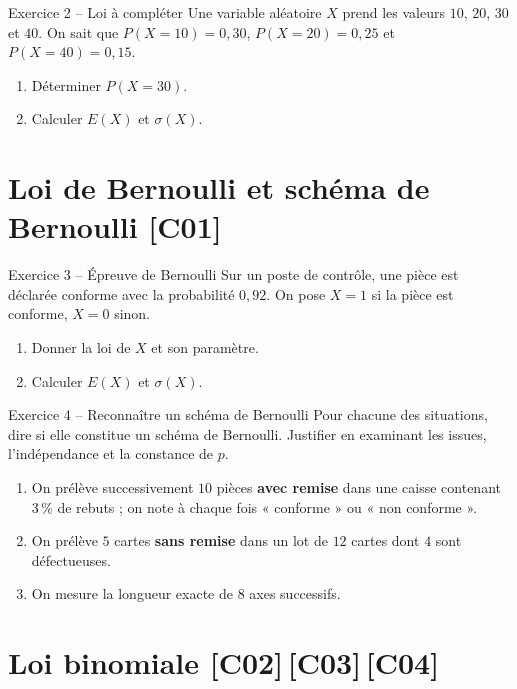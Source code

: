 \documentclass[a4paper,11pt]{article}
\begin{document}
\begin{exo}{Exercice 2 -- Loi à compléter}
Une variable aléatoire $X$ prend les valeurs $10$, $20$, $30$ et $40$. On sait que $P(X=10)=0{,}30$, $P(X=20)=0{,}25$ et $P(X=40)=0{,}15$.
\begin{enumerate}[label=\alph*)]
  \item Déterminer $P(X=30)$.
  \item Calculer $E(X)$ et $\sigma(X)$.
\end{enumerate}
\end{exo}

\section{Loi de Bernoulli et schéma de Bernoulli \hfill {\normalsize\color{uimmred}[C01]}}

\begin{exo}{Exercice 3 -- Épreuve de Bernoulli}
Sur un poste de contrôle, une pièce est déclarée conforme avec la probabilité $0{,}92$. On pose $X = 1$ si la pièce est conforme, $X = 0$ sinon.
\begin{enumerate}[label=\alph*)]
  \item Donner la loi de $X$ et son paramètre.
  \item Calculer $E(X)$ et $\sigma(X)$.
\end{enumerate}
\end{exo}

\begin{exo}{Exercice 4 -- Reconnaître un schéma de Bernoulli}
Pour chacune des situations, dire si elle constitue un schéma de Bernoulli. Justifier en examinant les issues, l'indépendance et la constance de $p$.
\begin{enumerate}[label=\alph*)]
  \item On prélève successivement $10$ pièces \textbf{avec remise} dans une caisse contenant $3\,\%$ de rebuts ; on note à chaque fois « conforme » ou « non conforme ».
  \item On prélève $5$ cartes \textbf{sans remise} dans un lot de $12$ cartes dont $4$ sont défectueuses.
  \item On mesure la longueur exacte de $8$ axes successifs.
\end{enumerate}
\end{exo}

\section{Loi binomiale \hfill {\normalsize\color{uimmred}[C02]\,[C03]\,[C04]}}
\end{document}
